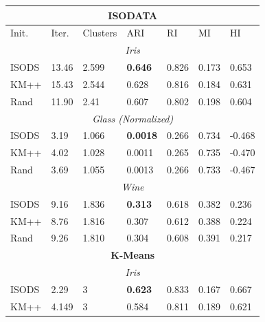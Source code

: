 \documentclass[a4paper,10pt]{article}
\begin{document}

\begin{table}[ht]
      \begin{tabular}{ |p{1.25cm}||p{1.25cm} p{1.25cm} p{1.25cm} p{1.25cm} p{1.25cm} p{1.25cm}|}
            \hline
            \multicolumn{7}{|c|}{\textbf{ISODATA}}                               \\
            \hline
            Init. & Iter.  & Clusters & ARI             & RI    & MI    & HI     \\
            \hline
            \multicolumn{7}{|c|}{\textit{Iris}}                                  \\[1ex]
            ISODS & 13.46  & 2.599    & \textbf{0.646}  & 0.826 & 0.173 & 0.653  \\
            KM++  & 15.43  & 2.544    & 0.628           & 0.816 & 0.184 & 0.631  \\
            Rand  & 11.90  & 2.41     & 0.607           & 0.802 & 0.198 & 0.604  \\
            \hline
            \multicolumn{7}{|c|}{\textit{Glass (Normalized)}}                    \\[1ex]
            ISODS & 3.19   & 1.066    & \textbf{0.0018} & 0.266 & 0.734 & -0.468 \\
            KM++  & 4.02   & 1.028    & 0.0011          & 0.265 & 0.735 & -0.470 \\
            Rand  & 3.69   & 1.055    & 0.0013          & 0.266 & 0.733 & -0.467 \\
            \hline
            \multicolumn{7}{|c|}{\textit{Wine}}                                  \\[1ex]
            ISODS & 9.16   & 1.836    & \textbf{0.313}  & 0.618 & 0.382 & 0.236  \\
            KM++  & 8.76   & 1.816    & 0.307           & 0.612 & 0.388 & 0.224  \\
            Rand  & 9.26   & 1.810    & 0.304           & 0.608 & 0.391 & 0.217  \\
            \hline 
            \multicolumn{7}{|c|}{\textbf{K-Means}}                               \\
            \hline
            \multicolumn{7}{|c|}{\textit{Iris}}                                  \\[1ex]
            ISODS & 2.29   & 3        & \textbf{0.623}  & 0.833 & 0.167 & 0.667  \\
            KM++  & 4.149  & 3        & 0.584           & 0.811 & 0.189 & 0.621  \\

\end{tabular}
\end{table}
\end{document}
